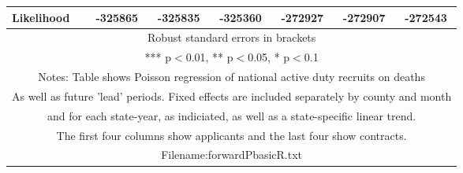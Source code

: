 \documentclass[]{article}
\begin{document}
\begin{tabular}{lcccccc}
 Likelihood & -325865 & -325835 & -325360 & -272927 & -272907 & -272543 \\ \hline
\multicolumn{7}{c}{ Robust standard errors in brackets} \\
\multicolumn{7}{c}{ *** p$<$0.01, ** p$<$0.05, * p$<$0.1} \\
\multicolumn{7}{c}{ Notes: Table shows Poisson regression of national active duty recruits on deaths} \\
\multicolumn{7}{c}{ As well as future 'lead' periods. Fixed effects are included separately by county and month} \\
\multicolumn{7}{c}{ and for each state-year, as indiciated, as well as a state-specific linear trend.} \\
\multicolumn{7}{c}{ The first four columns show applicants and the last four show contracts.} \\
\multicolumn{7}{c}{ Filename:forwardPbasicR.txt} \\
\end{tabular}
\end{document}
